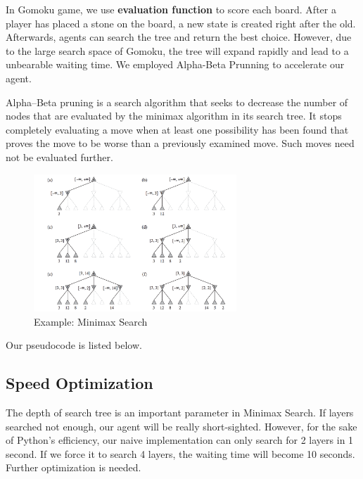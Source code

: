 \documentclass[11pt,a4paper]{article}
\begin{document}
In Gomoku game, we use \textbf{evaluation function} to score each board. After a player has placed a stone on the board, a new state is created right after the old. Afterwards, agents can search the tree and return the best choice. However, due to the large search space of Gomoku, the tree will expand rapidly and lead to a unbearable waiting time. We employed Alpha-Beta Prunning to accelerate our agent.

Alpha–Beta pruning is a search algorithm that seeks to decrease the number of nodes that are evaluated by the minimax algorithm in its search tree. It stops completely evaluating a move when at least one possibility has been found that proves the move to be worse than a previously examined move. Such moves need not be evaluated further. 

\begin{figure}[!h]
\centering\includegraphics[width=3in]{4.png}
\caption{Example: Minimax Search}
\end{figure}

Our pseudocode is listed below.


\subsection{Speed Optimization}
The depth of search tree is an important parameter in Minimax Search. If layers searched not enough, our agent will be really short-sighted. However, for the sake of Python's efficiency, our naive implementation can only search for 2 layers in 1 second. If we force it to search 4 layers, the waiting time will become 10 seconds. Further optimization is needed.
\end{document}

